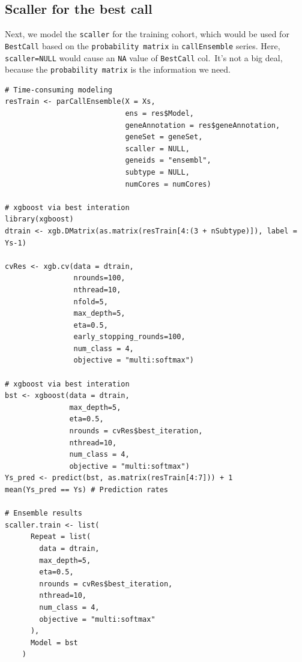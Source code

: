 \documentclass[
  12pt,
]{book}
\newcommand{\passthrough}[1]{#1}
\begin{document}
\hypertarget{scaller-for-the-best-call}{%
\subsection{Scaller for the best call}\label{scaller-for-the-best-call}}

Next, we model the \passthrough{\lstinline!scaller!} for the training cohort, which would be used for \passthrough{\lstinline!BestCall!} based on the \passthrough{\lstinline!probability matrix!} in \passthrough{\lstinline!callEnsemble!} series. Here, \passthrough{\lstinline!scaller=NULL!} would cause an \passthrough{\lstinline!NA!} value of \passthrough{\lstinline!BestCall!} col.~It's not a big deal, because the \passthrough{\lstinline!probability matrix!} is the information we need.

\begin{lstlisting}
# Time-consuming modeling
resTrain <- parCallEnsemble(X = Xs,
                            ens = res$Model,
                            geneAnnotation = res$geneAnnotation,
                            geneSet = geneSet,
                            scaller = NULL,
                            geneids = "ensembl",
                            subtype = NULL,
                            numCores = numCores)

# xgboost via best interation
library(xgboost)
dtrain <- xgb.DMatrix(as.matrix(resTrain[4:(3 + nSubtype)]), label = Ys-1)

cvRes <- xgb.cv(data = dtrain,
                nrounds=100,
                nthread=10,
                nfold=5,
                max_depth=5,
                eta=0.5,
                early_stopping_rounds=100,
                num_class = 4,
                objective = "multi:softmax")

# xgboost via best interation
bst <- xgboost(data = dtrain,
               max_depth=5,
               eta=0.5,
               nrounds = cvRes$best_iteration,
               nthread=10,
               num_class = 4,
               objective = "multi:softmax")
Ys_pred <- predict(bst, as.matrix(resTrain[4:7])) + 1
mean(Ys_pred == Ys) # Prediction rates

# Ensemble results
scaller.train <- list(
      Repeat = list(
        data = dtrain,
        max_depth=5,
        eta=0.5,
        nrounds = cvRes$best_iteration,
        nthread=10,
        num_class = 4,
        objective = "multi:softmax"
      ), 
      Model = bst
    )
\end{lstlisting}
\end{document}
